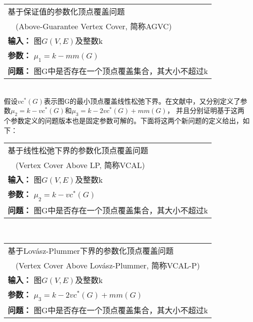 \begin{tabular}{| p{0.9\headwidth} |}
  \hline
  基于保证值的参数化顶点覆盖问题 \\ \ \ (Above-Guarantee Vertex Cover, 简称AGVC) \\
  \textbf{输入：} 图$G(V, E)$及整数k \\
  \textbf{参数：} $\mu_1 = k - mm(G)$\\
  \textbf{问题：} 图G中是否存在一个顶点覆盖集合，其大小不超过k\\
  \hline
\end{tabular} \vspace{0.5cm} \\
假设$vc^*(G)$表示图G的最小顶点覆盖线性松弛下界。在文献\cite{narayanaswamy2012lp, garg2015raising}中，又分别定义了参数$\mu_2 = k - vc^*(G)$和$\mu_3 = k - 2vc^*(G) + mm(G)$，
并且分别证明基于这两个参数定义的问题版本也是固定参数可解的。下面将这两个新问题的定义给出，如下： \\

\begin{tabular}{| p{0.9\headwidth} |}
  \hline
  基于线性松弛下界的参数化顶点覆盖问题 \\ \ \ (Vertex Cover Above LP, 简称VCAL) \\
  \textbf{输入：} 图$G(V, E)$及整数k \\
  \textbf{参数：} $\mu_2 = k - vc^*(G)$\\
  \textbf{问题：} 图G中是否存在一个顶点覆盖集合，其大小不超过k\\
  \hline
\end{tabular} \vspace{0.5cm} \\

\begin{tabular}{| p{0.9\headwidth} |}
  \hline
  基于Lov\'asz-Plummer下界的参数化顶点覆盖问题 \\ \ \ (Vertex Cover Above Lov\'asz-Plummer, 简称VCAL-P) \\
  \textbf{输入：} 图$G(V, E)$及整数k \\
  \textbf{参数：} $\mu_3 = k - 2vc^*(G) + mm(G)$\\
  \textbf{问题：} 图G中是否存在一个顶点覆盖集合，其大小不超过k\\
  \hline
\end{tabular} \vspace{0.5cm} \\

